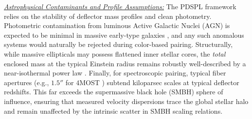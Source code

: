 \documentclass[a4paper,11pt]{article}
\begin{document}
\noindent \underline{\textit{Astrophysical Contaminants and Profile Assumptions:}} 
The PDSPL framework relies on the stability of deflector mass profiles and clean photometry. Photometric contamination from luminous Active Galactic Nuclei (AGN) is expected to be minimal in massive early-type galaxies \citep{Kauffmann:2003}, and any such anomalous systems would naturally be rejected during color-based pairing. Structurally, while massive ellipticals may possess flattened inner stellar cores, the \textit{total} enclosed mass at the typical Einstein radius remains robustly well-described by a near-isothermal power law \citep{Koopmans:2009}. Finally, for spectroscopic pairing, typical fiber apertures (e.g., $1.5''$ for 4MOST \cite{4MOST:2012}) subtend kiloparsec scales at typical deflector redshifts. This far exceeds the supermassive black hole (SMBH) sphere of influence, ensuring that measured velocity dispersions trace the global stellar halo and remain unaffected by the intrinsic scatter in SMBH scaling relations.

\end{document}
